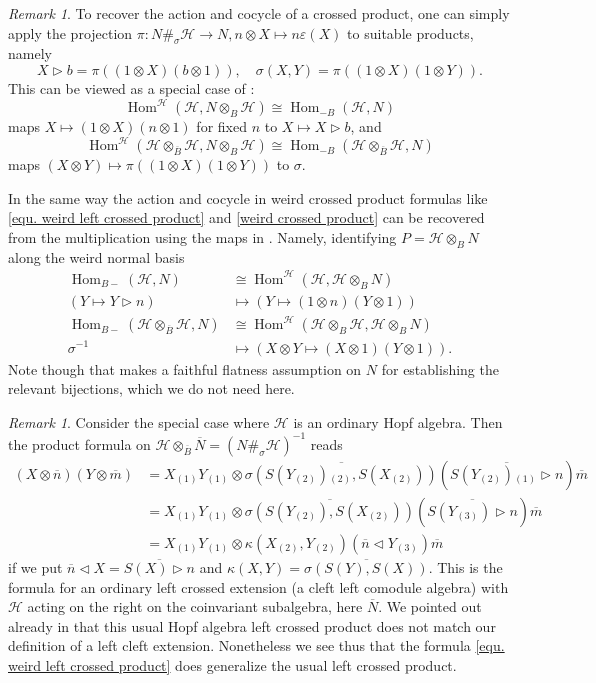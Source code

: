 \documentclass[a4paper,reqno]{amsart}
\DeclareMathOperator{\Hom}{Hom}
\numberwithin{equation}{section}
\theoremstyle{plain}
\theoremstyle{remark}
\newtheorem{rem}[thm]{Remark}
\numberwithin{equation}{section}
\newcommand\inv{^{-1}}
\newcommand{\ot}{\otimes}
\newcommand\ol{\overline}
\newcommand{\BB}{\overline{B}}
\renewcommand{\o}{{}_{\scriptscriptstyle{(1)}}}
\renewcommand{\t}{{}_{\scriptscriptstyle{(2)}}}
\renewcommand{\th}{{}_{\scriptscriptstyle{(3)}}}
\newcommand\ou[1]{\otimes_{#1}}
\newcommand{\la}{{\triangleright}}
\newcommand{\CH}{\mathcal{H}}
\begin{document}
\begin{rem}
  To recover the action and cocycle of a crossed product, one can simply apply the projection $\pi\colon N\#_\sigma\CH\to N, n\ot X\mapsto n\varepsilon(X)$ to suitable products, namely
  \[X\la b=\pi((1\ot X)(b\ot 1)),\quad \sigma(X,Y)=\pi((1\ot X)(1\ot Y)).\]
  This can be viewed as a special case of :
  \[\Hom^\CH(\CH,N\ou B\CH)\cong\Hom_{-B}(\CH,N)\]
  maps $X\mapsto (1\ot X)(n\ot 1)$ for fixed $n$ to $X\mapsto X\la b$, and
  \[\Hom^\CH(\CH\ou \BB\CH,N\ou B\CH)\cong \Hom_{-B}(\CH\ou\BB\CH,N)\]
  maps $(X\ot Y)\mapsto \pi((1\ot X)(1\ot Y))$ to $\sigma$.
  
   In the same way the  action and cocycle in weird crossed product formulas like \eqref{equ. weird left crossed product} and \eqref{weird crossed product} can be recovered from the multiplication  using the maps in . Namely, identifying $P=\CH\ou BN$ along the weird normal basis
   \begin{align*}
       \Hom_{B-}(\CH,N)&\cong\Hom^\CH(\CH,\CH\ou BN)\\
       (Y\mapsto Y\la n)&\mapsto (Y\mapsto (1\ot n)(Y\ot 1))\\
       \Hom_{B-}(\CH\ou{\BB}\CH,N)&\cong\Hom^\CH(\CH\ou B\CH,\CH\ou BN)\\
       \sigma\inv&\mapsto(X\ot Y\mapsto (X\ot 1)(Y\ot 1)).
   \end{align*}
 Note though that  makes a faithful flatness assumption on $N$ for establishing the relevant bijections, which we do not need here.
\end{rem}
\begin{rem}
    Consider the special case where $\CH$ is an ordinary Hopf algebra. Then the product formula on $\CH\ou{\ol B}\ol N=(N\#_\sigma\CH)\inv$ reads
    \begin{align*}
        (X\ot\ol n)(Y\ot \ol m)
        &=X\o Y\o\ot \ol{\sigma(S(Y\t)\t,S(X\t))}(\ol{S(Y\t)\o\la n})\ol m\\
        &=X\o Y\o\ot\ol{\sigma(S(Y\t),S(X\t))}(\ol{S(Y\th)\la n})\ol m\\
        &=X\o Y\o\ot\kappa(X\t,Y\t)(\ol n\triangleleft Y\th)\ol m
    \end{align*}
    if we put $\ol n\triangleleft X=\ol{S(X)\la n}$  and $\kappa(X,Y)=\ol{\sigma(S(Y),S(X))}$. This is the formula for an ordinary left crossed extension (a cleft left comodule algebra) with $\CH$ acting on the right on the coinvariant subalgebra, here $\ol N$. We pointed out already in  that this usual Hopf algebra left crossed product does not match our definition of a left cleft extension. Nonetheless we see thus that the formula \eqref{equ. weird left crossed product} does generalize the usual left crossed product.
\end{rem}
\end{document}
